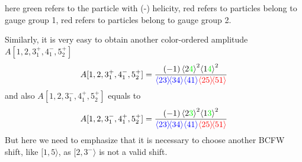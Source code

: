 \documentclass[12pt]{article}
\newcommand{\mdavg}[2]{\langle #1 \rangle\!\langle #2 \rangle}
\newcommand{\avg}[1]{\left\langle #1 \right\rangle}
\begin{document}
here green refers to the particle with (-) helicity, red refers to particles belong to gauge group 1, red refers to particles belong to gauge group 2.
\par
Similarly, it is very easy to obtain another color-ordered amplitude $A[1,2,3_1^+,4_1^-,5_2^+]$
\begin{align*}
    A[1,2,3_1^+,4_1^-,5_2^+]=
    \frac{(-1)\avg{2\textcolor{green}{4}}^2\!\avg{1\textcolor{green}{4}}^2}{\textcolor{blue}{\mdavg{23}{34}\!\avg{41}}\textcolor{red}{\mdavg{25}{51}}}
\end{align*}
and also $A[1,2,3_1^-,4_1^+,5_2^+]$ equals to
\begin{equation*}
    A[1,2,3_1^-,4_1^+,5_2^+]=
    \frac{(-1)\avg{2\textcolor{green}{3}}^2\!\avg{1\textcolor{green}{3}}^2}{\textcolor{blue}{\mdavg{23}{34}\!\avg{41}}\textcolor{red}{\mdavg{25}{51}}}
\end{equation*}
But here we need to emphasize that it is necessary to choose another BCFW shift, like $[1,5 \rangle$, as $[2,3^- \rangle$ is not a valid shift. 
\end{document}
